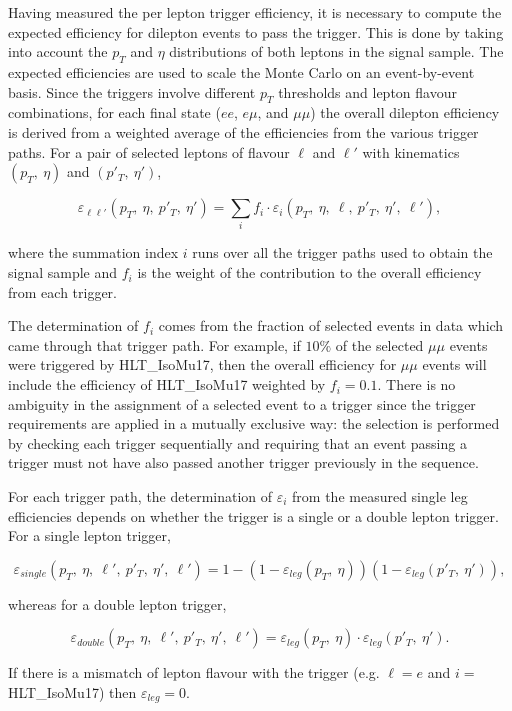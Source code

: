 Having measured the per lepton trigger efficiency,
it is necessary to compute the expected efficiency for dilepton events to pass the trigger.
This is done by taking into account the $p_{T}$ and $\eta$ distributions
of both leptons in the signal sample. The expected efficiencies are used to scale
the Monte Carlo on an event-by-event basis. Since the triggers involve different $p_T$ 
thresholds and lepton flavour combinations, for each final state ($ee$, $e\mu$, and $\mu\mu$)
the overall dilepton efficiency is derived from a weighted average of the 
efficiencies from the various trigger paths. For a pair of selected leptons of flavour $\ell$ and $\ell'$
with kinematics $(p_T,\:\eta)$ and $(p'_T,\:\eta')$, 

\begin{equation}
\varepsilon_{\ell\ell'}(p_T,\:\eta,\:p'_T,\:\eta') = \sum_i f_i\cdot\varepsilon_i(p_T,\:\eta,\:\ell,\:p'_T,\:\eta',\:\ell'),
\end{equation}

where the summation index $i$ runs over all the trigger paths used to obtain the signal sample and $f_i$
is the weight of the contribution to the overall efficiency from each trigger.

The determination of $f_i$ comes from the fraction of selected events in data which came 
through that trigger path. For example, if $10\%$ of the selected $\mu\mu$ events were triggered 
by HLT\_IsoMu17, then the overall efficiency for $\mu\mu$ events will include the efficiency 
of HLT\_IsoMu17 weighted by $f_i=0.1$. There is no ambiguity in the assignment of a selected event to
a trigger since the trigger requirements are applied in a mutually exclusive way: the selection is
performed by checking each trigger sequentially and requiring that an event passing a trigger
must not have also passed another trigger previously in the sequence.

For each trigger path, the determination of $\varepsilon_i$ from the measured single leg efficiencies depends
on whether the trigger is a single or a double lepton trigger. For a single lepton trigger,

\begin{equation}
\varepsilon_{single}(p_T,\:\eta,\:\ell',\:p'_T,\:\eta',\:\ell') = 
1 - \left(1-\varepsilon_{leg}(p_T,\:\eta)\right)\left(1-\varepsilon_{leg}(p'_T,\:\eta')\right),
\end{equation}

whereas for a double lepton trigger,

\begin{equation}
\varepsilon_{double}(p_T,\:\eta,\:\ell',\:p'_T,\:\eta',\:\ell') = \varepsilon_{leg}(p_T,\:\eta)\cdot\varepsilon_{leg}(p'_T,\:\eta').
\end{equation}

If there is a mismatch of lepton flavour with the trigger (e.g. $\ell=e$ and $i=$HLT\_IsoMu17) then $\varepsilon_{leg}=0$.
